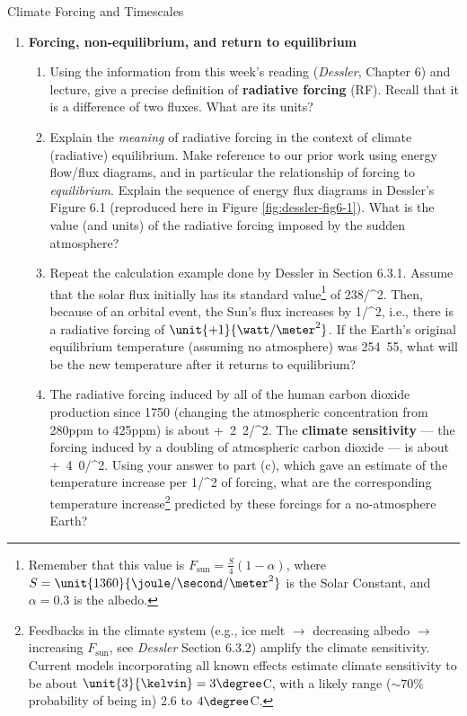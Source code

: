\documentclass[12pt]{article}
\begin{document}
\begin{center}
{\Large Climate Forcing and Timescales}
\end{center}


%

\begin{enumerate}

\item  {\bf Forcing, non-equilibrium, and return to equilibrium}
	\begin{enumerate}
	\item Using the information from this week's reading ({\em Dessler}, Chapter 6) and lecture, give a precise definition of {\bf radiative forcing} (RF).  Recall that it is a difference of two fluxes.  What are its units?
	\item Explain the {\em meaning} of radiative forcing in the context of climate (radiative) equilibrium.  Make reference to our prior work using energy flow/flux diagrams, and in particular the relationship of forcing to {\em equilibrium}. Explain the sequence of energy flux diagrams in Dessler's Figure 6.1 (reproduced here in Figure \ref{fig:dessler-fig6-1}).  What is the value (and units) of the radiative forcing imposed by the sudden atmosphere?
	\item Repeat the calculation example done by Dessler in Section 6.3.1. Assume that the solar flux initially has its standard value\footnote{Remember that this value is $F_\text{sun} = \frac{S}{4} (1 - \alpha)$, where $S=\unit{1360}{\joule/\second/\meter^2}$ is the Solar Constant, and $\alpha = 0.3$ is the albedo.}  of \unit{238}{\watt/\meter^2}.  Then, because of an orbital event, the Sun's flux increases by \unit{1}{\watt/\meter^2}, i.e., there is a radiative forcing of $\unit{+1}{\watt/\meter^2}$.  If the Earth's original equilibrium temperature (assuming no atmosphere) was \unit{254.55}{\kelvin}, what will be the new temperature after it returns to equilibrium?
	\item The radiative forcing induced by all of the human carbon dioxide production since 1750 (changing the atmospheric concentration from \unit{280}{ppm} to \unit{425}{ppm}) is about \unit{+2.2}{\watt/\meter^2}. The {\bf climate sensitivity} --- the forcing induced by a doubling of atmospheric carbon dioxide --- is about \unit{+4.0}{\watt/\meter^2}.  Using your answer to part (c), which gave an estimate of the temperature increase per \unit{1}{\watt/\meter^2} of forcing, what are the corresponding temperature increase\footnote{Feedbacks in the climate system (e.g., ice melt $\rightarrow$ decreasing albedo $\rightarrow$ increasing $F_\text{sun}$, see {\em Dessler} Section 6.3.2) amplify the climate sensitivity.  Current models incorporating all known effects estimate climate sensitivity to be about $\unit{3}{\kelvin} = 3\degree$C, with a likely range ($\sim70\%$ probability of being in) 2.6 to $4\degree$C.} predicted by these forcings for a no-atmosphere Earth?

\end{enumerate}
\end{enumerate}
\end{document}
